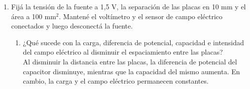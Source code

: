 \documentclass[12pt]{report}
\begin{document}
\begin{enumerate}
    \item Fijá la tensión de la fuente a 1,5 V, la separación de las placas en 10 mm y el área a 100 mm$^2$. Mantené el voltímetro y el sensor de campo eléctrico conectados y luego desconectá la fuente.
    \begin{enumerate}
        \item ¿Qué sucede con la carga, diferencia de potencial, capacidad e intensidad del campo eléctrico al disminuir el espaciamiento entre las placas?\\[6pt]
            Al disminuir la distancia entre las placas, la diferencia de potencial del capacitor disminuye, mientras que la capacidad del mismo aumenta. En cambio, la carga  y el campo eléctrico permanecen constantes.
        

\end{enumerate}
\end{enumerate}
\end{document}
